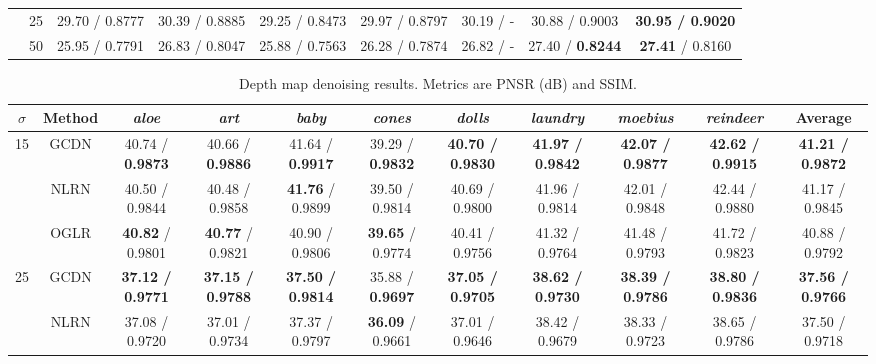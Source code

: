 \documentclass[journal]{IEEEtran}
\begin{document}
\begin{table*}[t]
\begin{tabular}{ccccccccc}
                          & 25             & 29.70 / 0.8777 & 30.39 / 0.8885 & 29.25 / 0.8473 & 29.97 / 0.8797 & 30.19 / - & 30.88 / 0.9003 & \textbf{30.95 / 0.9020}         \\ 
                          & 50             & 25.95 / 0.7791 & 26.83 / 0.8047 & 25.88 / 0.7563 & 26.28 / 0.7874 & 26.82 / - & 27.40 / \textbf{0.8244} & \textbf{27.41} / 0.8160          \\ \hline
\end{tabular}
\label{table:results}
\end{table*}

\begin{table*}[t]
\setlength{\tabcolsep}{4pt} \renewcommand{\arraystretch}{1} \centering
\caption{Depth map denoising results. Metrics are PNSR (dB) and SSIM.}
\begin{tabular}{ccccccccccc}
\hline
$\sigma$      & Method   & \textit{aloe}           & \textit{art}            & \textit{baby}           & \textit{cones}          & \textit{dolls}          & \textit{laundry}        & \textit{moebius}        & \textit{reindeer}               & Average                 \\ \hline
\multirow{3}{*}{15} & GCDN & 40.74 / \textbf{0.9873}          & 40.66 / \textbf{0.9886}          & 41.64 / \textbf{0.9917}          & 39.29 / \textbf{0.9832}          & \textbf{40.70 / 0.9830} & \textbf{41.97 / 0.9842} & \textbf{42.07 / 0.9877}   & \textbf{42.62 / 0.9915}           & \textbf{41.21 / 0.9872} \\ 
                    & NLRN     & 40.50 / 0.9844          & 40.48 / 0.9858          & \textbf{41.76} / 0.9899 & 39.50 / 0.9814          & 40.69 / 0.9800          & 41.96 / 0.9814          & 42.01 / 0.9848          & 42.44 / 0.9880           & 41.17 / 0.9845          \\
                    & OGLR     & \textbf{40.82} / 0.9801 & \textbf{40.77} / 0.9821 & 40.90 / 0.9806          & \textbf{39.65} / 0.9774 & 40.41 / 0.9756          & 41.32 / 0.9764          & 41.48 / 0.9793          & 41.72 / 0.9823                   & 40.88 / 0.9792          \\ \hline
\multirow{3}{*}{25} & GCDN & \textbf{37.12 / 0.9771} & \textbf{37.15 / 0.9788} & \textbf{37.50 / 0.9814} & 35.88 / \textbf{0.9697}          & \textbf{37.05 / 0.9705} & \textbf{38.62 / 0.9730} & \textbf{38.39 / 0.9786} & \textbf{38.80 / 0.9836}          & \textbf{37.56 / 0.9766} \\ 
                    & NLRN     & 37.08 / 0.9720          & 37.01 / 0.9734          & 37.37 / 0.9797          & \textbf{36.09} / 0.9661 & 37.01 / 0.9646          & 38.42 / 0.9679          & 38.33 / 0.9723          & 38.65 / 0.9786         & 37.50 / 0.9718          \\ 

\end{tabular}
\end{table*}
\end{document}
